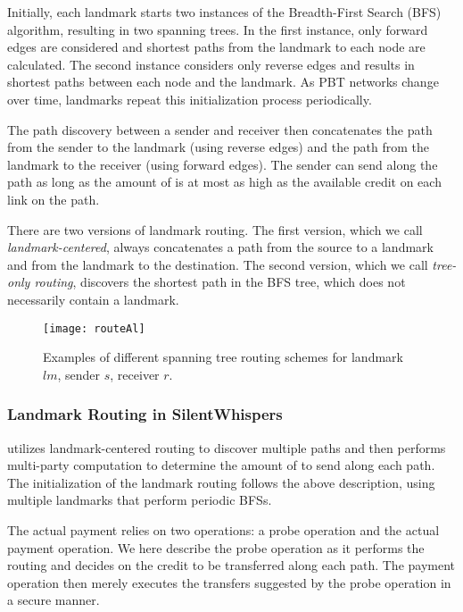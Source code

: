 Initially, each landmark starts two instances of the 
Breadth-First Search (BFS) algorithm, resulting in two spanning trees. In the first instance, only forward edges are considered and 
shortest paths from the landmark to each node are calculated. The second instance 
considers only reverse edges and results in shortest paths between each node and the landmark. 
As PBT networks change over time, landmarks repeat this initialization process periodically.  
 
 
The path discovery between a sender and receiver then concatenates the path from the sender to the landmark
(using reverse edges) and the path from the landmark to the receiver (using forward edges).   
The sender can send \money along the path as long as the amount of \money is at most as high as the available
credit on each link on the path. 

There are two versions of landmark routing. The first version, which we call \emph{landmark-centered}, always concatenates a path from the
source to a landmark and from the landmark to the destination.
The second version, which we call \emph{tree-only routing},
discovers the shortest path in the BFS tree, which does not necessarily contain a landmark. 

\begin{figure*}[t]
\centering
\texttt{[image: routeAl]}

\caption{Examples of different spanning tree routing schemes for landmark $lm$, sender $s$, receiver $r$.}
\label{fig:concepts-no-infer}
\vspace{-1em}
\end{figure*}

\subsubsection{Landmark Routing in SilentWhispers}
\cnsysname utilizes landmark-centered routing to discover multiple paths and then performs multi-party
computation to determine the amount of \money to send along each path. 
The initialization of the landmark routing follows the above description, using multiple landmarks
that perform periodic BFSs. 

The actual payment relies on two operations: a probe operation and the actual payment operation.
We here describe the probe operation as it performs the routing and decides on the credit to be transferred along each path.
The payment operation then merely executes the transfers suggested by the probe operation in a secure manner.  

